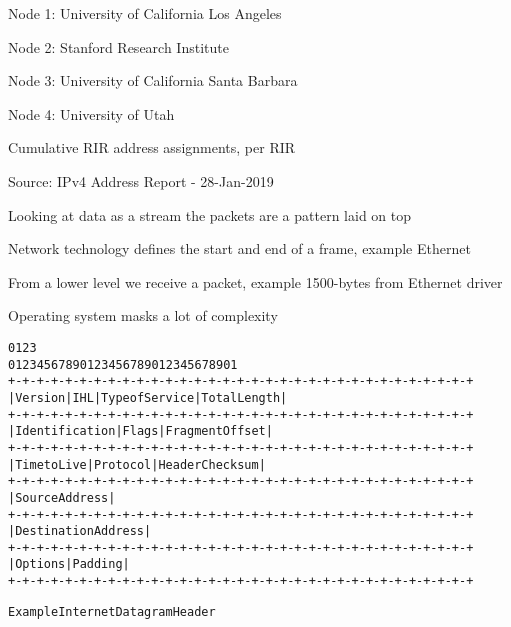 \documentclass[Screen16to9,17pt]{foils}
\begin{document}

\begin{list2}
\item Node 1: University of California Los Angeles
\item Node 2: Stanford Research Institute
\item Node 3: University of California Santa Barbara
\item Node 4: University of Utah
\end{list2}




\centerline{Cumulative RIR address assignments, per RIR}

\begin{list1}
\item Source:
IPv4 Address Report - 28-Jan-2019
\end{list1}



\begin{list1}
\item Looking at data as a stream the packets are a pattern laid on top
\item Network technology defines the start and end of a frame, example Ethernet
\item From a lower level we receive a packet, example 1500-bytes from Ethernet driver
\item Operating system masks a lot of complexity
\end{list1}



\begin{alltt}\small
    0                   1                   2                   3
    0 1 2 3 4 5 6 7 8 9 0 1 2 3 4 5 6 7 8 9 0 1 2 3 4 5 6 7 8 9 0 1
   +-+-+-+-+-+-+-+-+-+-+-+-+-+-+-+-+-+-+-+-+-+-+-+-+-+-+-+-+-+-+-+-+
   |Version|  IHL  |Type of Service|          Total Length         |
   +-+-+-+-+-+-+-+-+-+-+-+-+-+-+-+-+-+-+-+-+-+-+-+-+-+-+-+-+-+-+-+-+
   |         Identification        |Flags|      Fragment Offset    |
   +-+-+-+-+-+-+-+-+-+-+-+-+-+-+-+-+-+-+-+-+-+-+-+-+-+-+-+-+-+-+-+-+
   |  Time to Live |    Protocol   |         Header Checksum       |
   +-+-+-+-+-+-+-+-+-+-+-+-+-+-+-+-+-+-+-+-+-+-+-+-+-+-+-+-+-+-+-+-+
   |                       Source Address                          |
   +-+-+-+-+-+-+-+-+-+-+-+-+-+-+-+-+-+-+-+-+-+-+-+-+-+-+-+-+-+-+-+-+
   |                    Destination Address                        |
   +-+-+-+-+-+-+-+-+-+-+-+-+-+-+-+-+-+-+-+-+-+-+-+-+-+-+-+-+-+-+-+-+
   |                    Options                    |    Padding    |
   +-+-+-+-+-+-+-+-+-+-+-+-+-+-+-+-+-+-+-+-+-+-+-+-+-+-+-+-+-+-+-+-+

                    Example Internet Datagram Header
\end{alltt}
\end{document}
